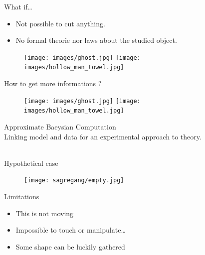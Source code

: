 \documentclass[10pt, notes=show]{beamer}
\begin{document}
\begin{frame}{What if\ldots}
    \begin{itemize}
        \item<+-> Not possible to cut anything.
        \item<+-> No formal theorie nor laws about the studied object.
    \end{itemize}
        \pause
    \begin{figure}[h]
        \centering
        \texttt{[image: images/ghost.jpg]}\hfill
        \pause
        \texttt{[image: images/hollow\_man\_towel.jpg]}
    \end{figure}
\end{frame}


\begin{frame}{}
    How to get more informations ?
    \begin{figure}
        \texttt{[image: images/ghost.jpg]}\hfill
        \texttt{[image: images/hollow\_man\_towel.jpg]}\\
         \hfill
    \end{figure}

\end{frame}

\begin{frame}{}
    \center
    Approximate Baeysian Computation\\Linking model and data for an experimental approach to theory.\\
    \vspace{1cm}
    \\
    \vspace{1cm}
\end{frame}




\begin{frame}{Hypothetical case}
    \begin{figure}
        \texttt{[image: sagregang/empty.jpg]}
    \end{figure}
\end{frame}

\begin{frame}{Limitations}
    \begin{itemize}
        \item<+-> This is not moving
        \item<+-> Impossible to touch or manipulate\ldots
        \item<+-> Some shape can be luckily gathered 
    \end{itemize}
    \vfil
    \begin{figure}
    \end{figure}
\end{frame}
\end{document}

